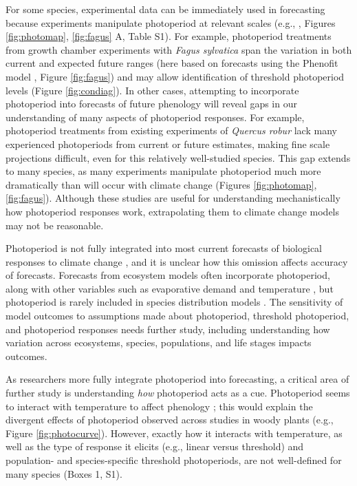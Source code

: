 \documentclass{article}
\begin{document}
\par For some species, experimental data can be immediately used in forecasting because experiments manipulate photoperiod at relevant scales (e.g., \citet{Basler:2014aa,Heide:2015aa}, Figures \ref{fig:photomap}, \ref{fig:fagus} A, Table S1).  For example, photoperiod treatments from growth chamber experiments with \emph{Fagus sylvatica} span the variation in both current and expected future ranges (here based on forecasts using the Phenofit model \citep{duputie2015}, Figure \ref{fig:fagus}) and may allow identification of threshold photoperiod levels (Figure \ref{fig:condiag}). In other cases, attempting to incorporate photoperiod into forecasts of future phenology will reveal gaps in our understanding of many aspects of photoperiod responses. For example, photoperiod treatments from existing experiments of \emph{Quercus robur} lack many experienced photoperiods from current or future estimates, making fine scale projections difficult, even for this relatively well-studied species. This gap extends to many species, as many experiments manipulate photoperiod much more dramatically than will occur with climate change (Figures \ref{fig:photomap}, \ref{fig:fagus}). Although these studies are useful for understanding mechanistically how photoperiod responses work, extrapolating them to climate change models may not be reasonable.

\par Photoperiod is not fully integrated into most current forecasts of biological responses to climate change \citep[but see][]{tobin2008}, and it is unclear how this omission affects accuracy of forecasts. Forecasts from ecosystem models often incorporate photoperiod, along with other variables such as evaporative demand and temperature \citep [e.g., ED] []{jolly2005, medvigy2013}, but photoperiod is rarely included in species distribution models \citep [e.g.,] []{morin2009,zhu2012}. The sensitivity of model outcomes to assumptions made about photoperiod, threshold photoperiod, and photoperiod responses needs further study, including understanding how variation across ecosystems, species, populations, and life stages impacts outcomes. 

\par As researchers more fully integrate photoperiod into forecasting, a critical area of further study is understanding \emph{how} photoperiod acts as a cue. Photoperiod seems to interact with temperature to affect phenology \citep[e.g., ][]{zydlewski2014}; this would explain the divergent effects of photoperiod observed across studies in woody plants (e.g., Figure \ref{fig:photocurve}). However, exactly how it interacts with temperature, as well as the type of response it elicits (e.g., linear versus threshold) and population- and species-specific threshold photoperiods, are not well-defined for many species (Boxes 1, S1).  
\end{document}
